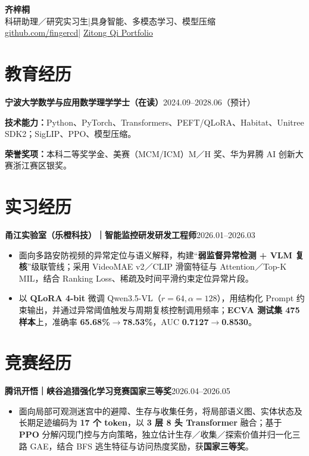 \documentclass[11pt,a4paper]{article}
\newcommand{\entry}[2]{\par\noindent\textbf{#1}\hfill #2\par}
\begin{document}
\fontsize{11}{14}\selectfont

\begin{center}
{\fontsize{25}{28}\selectfont\sffamily\textbf{齐梓桐}}\\[4pt]
科研助理／研究实习生\quad |\quad 具身智能、多模态学习、模型压缩\\[2pt]
\href{https://github.com/fingercd}{github.com/fingercd}\quad |\quad
\href{https://fingercd.github.io/zh/}{Zitong Qi Portfolio}
\end{center}
\section{教育经历}
\entry{宁波大学\quad 数学与应用数学\quad 理学学士（在读）}{2024.09--2028.06（预计）}
\textbf{技术能力：}Python、PyTorch、Transformers、PEFT/QLoRA、Habitat、Unitree SDK2；SigLIP、PPO、模型压缩。\par
\textbf{荣誉奖项：}本科二等奖学金、美赛（MCM/ICM）M／H 奖、华为昇腾 AI 创新大赛浙江赛区银奖。

\section{实习经历}
\entry{甬江实验室（乐橙科技）｜智能监控研发\quad 研发工程师}{2026.01--2026.03}
\begin{itemize}
\item 面向多路安防视频的异常定位与语义解释，构建“\textbf{弱监督异常检测 + VLM 复核}”级联管线；采用 VideoMAE v2／CLIP 滑窗特征与 Attention／Top-K MIL，结合 Ranking Loss、稀疏及时间平滑约束定位异常片段。
\item 以 \textbf{QLoRA 4-bit} 微调 Qwen3.5-VL（$r=64,\alpha=128$），用结构化 Prompt 约束输出，并通过异常阈值触发与周期复核控制调用频率；\textbf{ECVA 测试集 475 样本}上，准确率 \textbf{65.68\%$\rightarrow$78.53\%}，AUC \textbf{0.7127$\rightarrow$0.8530}。
\end{itemize}

\section{竞赛经历}
\entry{腾讯开悟｜峡谷追猎强化学习竞赛\quad \textbf{国家三等奖}}{2026.04--2026.05}
\begin{itemize}
\item 面向局部可观测迷宫中的避障、生存与收集任务，将局部语义图、实体状态及长期足迹编码为 \textbf{17 个 token}，以 \textbf{3 层 8 头 Transformer} 融合；基于 \textbf{PPO} 分解闪现门控与方向策略，独立估计生存／收集／探索价值并归一化三路 GAE，结合 BFS 逃生特征与访问热度奖励，获\textbf{国家三等奖}。
\end{itemize}
\end{document}
